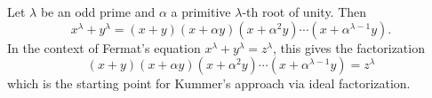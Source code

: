 Let $\lambda$ be an odd prime and $\alpha$ a primitive $\lambda$-th root of unity. Then
$$x^\lambda + y^\lambda = (x + y)(x + \alpha y)(x + \alpha^2 y) \cdots (x + \alpha^{\lambda-1} y).$$
In the context of Fermat's equation $x^\lambda + y^\lambda = z^\lambda$, this gives the factorization
$$(x + y)(x + \alpha y)(x + \alpha^2 y) \cdots (x + \alpha^{\lambda-1} y) = z^\lambda$$
which is the starting point for Kummer's approach via ideal factorization.
